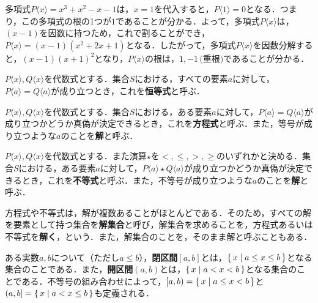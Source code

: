 \begin{example*}
	多項式$P\langle x\rangle = x^3+x^2-x-1$は，$x = 1$を代入すると，$P\langle 1\rangle = 0$となる．つまり，この多項式の根の1つが$1$であることが分かる．よって，多項式$P\langle x\rangle$は，$(x-1)$を因数に持つため，これで割ることができ，$P\langle x\rangle = (x-1)(x^2+2x+1)$となる．したがって，多項式$P\langle x\rangle$を因数分解すると，$(x-1)(x+1)^2$となり，$P\langle x\rangle$の根は，$1, -1\,\text{(重根)}$であることが分かる．
\end{example*}

\begin{definition}[恒等式]
	$P\langle x\rangle, Q\langle x\rangle$を代数式とする．集合$S$における，すべての要素$a$に対して，$P\langle a\rangle = Q\langle a\rangle$が成り立つとき，これを\textbf{恒等式}と呼ぶ．
\end{definition}
\begin{definition}[方程式]
	$P\langle x\rangle, Q\langle x\rangle$を代数式とする．集合$S$における，ある要素$a$に対して，$P\langle a\rangle = Q\langle a\rangle$が成り立つかどうか真偽が決定できるとき，これを\textbf{方程式}と呼ぶ．また，等号が成り立つような$a$のことを\textbf{解}と呼ぶ．
\end{definition}
\begin{definition}[不等式]
	$P\langle x\rangle, Q\langle x\rangle$を代数式とする．また演算$\star$を$<, \leq, >, \geq$のいずれかと決める．集合$S$における，ある要素$a$に対して，$P\langle a\rangle \star Q\langle a\rangle$が成り立つかどうか真偽が決定できるとき，これを\textbf{不等式}と呼ぶ．また，不等号が成り立つような$a$のことを\textbf{解}と呼ぶ．
\end{definition}
\begin{rem*}
	方程式や不等式は，解が複数あることがほとんどである．そのため，すべての解を要素として持つ集合を\textbf{解集合}と呼び，解集合を求めることを，方程式あるいは不等式を\textbf{解く}，という\footnotemark[2]．また，解集合のことを，そのまま解と呼ぶこともある．
\end{rem*}
\begin{definition}
	ある実数$a, b$について（ただし$a \leq b$），\textbf{閉区間}$\left[a, b\right]$とは，$\left\{\,x \mid a \leq x \leq b\,\right\}$となる集合のことである．また，\textbf{開区間}$\left(a, b\right)$とは，$\left\{\,x \mid a < x < b\,\right\}$となる集合のことである．不等号の組み合わせによって，$\left[a, b\right) = \left\{\,x \mid a \leq x < b\,\right\}$と$\left(a, b\right] = \left\{\,x \mid a < x \leq b\,\right\}$も定義される．
\end{definition}
